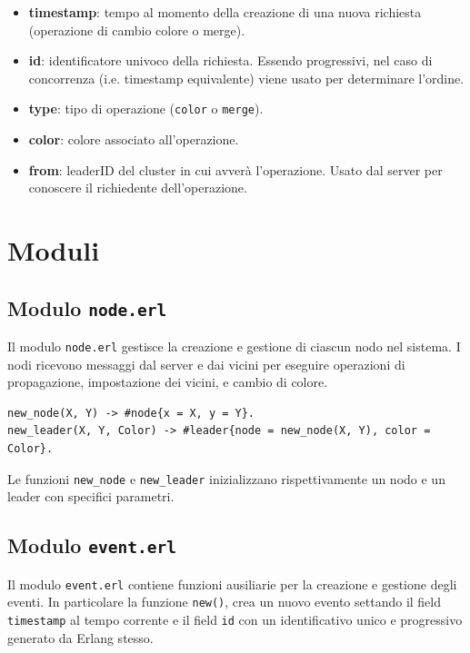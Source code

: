 \documentclass[12pt, a4paper]{report}
\begin{document}
\begin{itemize}
    \item \textbf{timestamp}: tempo al momento della creazione di una nuova richiesta (operazione di cambio colore o merge).
    \item \textbf{id}: identificatore univoco della richiesta. Essendo progressivi, nel caso di concorrenza (i.e. timestamp equivalente) viene usato per determinare l'ordine.
    \item \textbf{type}: tipo di operazione (\texttt{color} o \texttt{merge}).
    \item \textbf{color}: colore associato all'operazione.
    \item \textbf{from}: leaderID del cluster in cui avver\`a l'operazione. Usato dal server per conoscere il richiedente dell'operazione.
\end{itemize}

\section{Moduli}
\subsection{Modulo \texttt{node.erl}}

Il modulo \texttt{node.erl} gestisce la creazione e gestione di ciascun nodo nel sistema. I nodi ricevono messaggi dal server e dai vicini per eseguire operazioni di propagazione, impostazione dei vicini, e cambio di colore. 

\begin{tcolorbox}[title=Creazione di un nodo]
\begin{verbatim}
new_node(X, Y) -> #node{x = X, y = Y}.
new_leader(X, Y, Color) -> #leader{node = new_node(X, Y), color = Color}.
\end{verbatim}
\end{tcolorbox}

Le funzioni \texttt{new\_node} e \texttt{new\_leader} inizializzano rispettivamente un nodo e un leader con specifici parametri.

\subsection{Modulo \texttt{event.erl}}

Il modulo \texttt{event.erl} contiene funzioni ausiliarie per la creazione e gestione degli eventi. In particolare la funzione \texttt{new()}, crea un nuovo evento settando il field \texttt{timestamp} al tempo corrente e il field \texttt{id} con un identificativo unico e progressivo generato da Erlang stesso.
\end{document}
